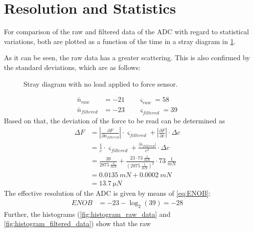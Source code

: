     \section{Resolution and Statistics}
        For comparison of the raw and filtered data of the ADC with regard to statistical variations, both are
        plotted as a function of the time in a stray diagram in \cref{fig:adc_result}.\par
        As it can be seen, the raw data has a greater scattering. This is also confirmed by the standard deviations, which are as follows:
        \begin{figure}[h]
            \centering
            
            \caption[Stray diagram with no load applied to force sensor]{Stray diagram with no load applied to force sensor.}
            \label{fig:adc_result}
        \end{figure}
        \begin{align*}
            \bar{n}_{raw}       &=-21 \qquad \varsigma_{raw}=58\\
            \bar{n}_{filtered}  &=-23 \qquad \varsigma_{filtered}=39
        \end{align*}
        Based on that, the deviation of the force to be read can be determined as
        \begin{align}
            \Delta F    &=\left| \frac{\partial F}{\partial \bar{n}_{filtered}} \right| \cdot \varsigma_{filtered} + \left| \frac{\partial F}{\partial c} \right| \cdot \Delta c \nonumber \\
                        &=\frac{1}{c} \cdot \varsigma_{filtered} + \frac{\left|\bar{n}_{filtered}\right|}{c^2} \cdot \Delta c \nonumber \\
                        &=\frac{39}{\SI{2875}{\frac{1}{mN}}} + \frac{23 \cdot \SI{73}{\frac{1}{mN}}}{(\SI{2875}{\frac{1}{mN}})^2} \cdot \SI{73}{\frac{1}{mN}} \nonumber \\
                        &=\SI{0.0135}{mN}+\SI{0.0002}{mN} \nonumber \\
                        &=\SI{13.7}{\micro N}
        \end{align}
        The effective resolution of the ADC is given by means of \cref{eq:ENOB}:
        \begin{align*}
            ENOB&=-23-\log_2(39)=-28
        \end{align*}
        Further, the histograms (\cref{fig:histogram_raw_data} and \cref{fig:histogram_filtered_data}) show that the raw
